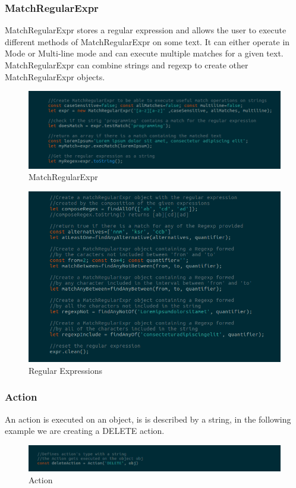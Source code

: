 \subsubsection{MatchRegularExpr}
MatchRegularExpr stores a regular expression and allows the user to execute different methods of MatchRegularExpr on some text.
It can either operate in  Mode or Multi-line mode and can execute multiple matches for a given text.
MatchRegularExpr can combine strings and regexp to create other MatchRegularExpr objects.
\begin{figure}[H]
	\centering
	\includegraphics[width=14cm]{../../documenti/UserManualFramework/framework_model/5framework_model_regexp1.png}
	\caption{MatchRegularExpr}
\end{figure}

\begin{figure}[H]
	\centering
	\includegraphics[width=14cm]{../../documenti/UserManualFramework/framework_model/6framework_model_regexp2.png}
	\caption{Regular Expressions}
\end{figure}

\subsubsection{Action}
An action is executed on an object, is is described by a string, in the following example we are creating a DELETE action. 
\begin{figure}[H]
	\centering
	\includegraphics[width=14cm]{../../documenti/UserManualFramework/framework_model/Action.png}
	\caption{Action}
\end{figure}

